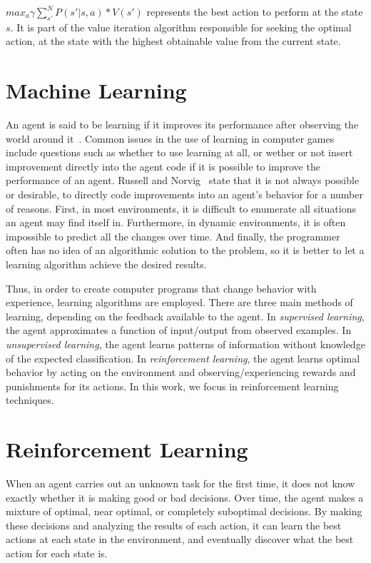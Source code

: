 $max_a \gamma \sum_{s'}^N P(s'|s,a) * V(s')$ represents the best action to perform at the state $s$.
It is part of the value iteration algorithm responsible for seeking the optimal action,
at the state with the highest obtainable value from the current state.



\section{Machine Learning}
\label{sec:machine-learning}

An agent is said to be learning if it improves its performance after observing the world around it~\cite{russell1995artificial}. 
Common issues in the use of learning in computer games include questions such as whether to use learning at all, or wether or not insert improvement directly into the agent code if it is possible to improve the performance of an agent. 
Russell and Norvig~\cite{russell1995artificial} state that it is not always possible or desirable, to directly code improvements into an agent's behavior for a number of reasons. First, in most environments, it is difficult to enumerate all situations an agent may find itself in. Furthermore, in dynamic environments, it is often impossible to predict all the changes over time. And finally, the programmer often has no idea of an algorithmic solution to the problem, so it is better to let a learning algorithm achieve the desired results.

Thus, in order to create computer programs that change behavior with experience, learning algorithms are employed. 
There are three main methods of learning, depending on the feedback available to the agent. 
In \emph{supervised learning}, the agent approximates a function of input/output from observed examples. 
In \emph{unsupervised learning}, the agent learns patterns of information without knowledge of the expected classification. 
In \emph{reinforcement learning}, the agent learns optimal behavior by acting on the environment and observing/experiencing rewards and punishments for its actions. 
In this work, we focus in reinforcement learning techniques.



\section{Reinforcement Learning}
\label{sec:rl}

When an agent carries out an unknown task for the first time, it does not know exactly whether it is making good or bad decisions. 
Over time, the agent makes a mixture of optimal, near optimal, or completely suboptimal decisions. 
By making these decisions and analyzing the results of each action, it can learn the best actions at each state in the environment, and eventually discover what the best action for each state is. 

